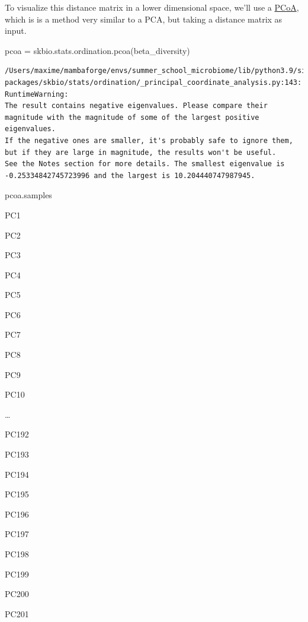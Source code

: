 \documentclass[
  letterpaper,
]{book}
\newenvironment{Shaded}{}{}
\newcommand{\NormalTok}[1]{\textcolor[rgb]{0.14,0.16,0.18}{#1}}
\newcommand{\OperatorTok}[1]{\textcolor[rgb]{0.14,0.16,0.18}{#1}}
\begin{document}
To visualize this distance matrix in a lower dimensional space, we'll
use a
\href{https://en.wikipedia.org/wiki/Multidimensional_scaling\#Types}{PCoA},
which is is a method very similar to a PCA, but taking a distance matrix
as input.

\begin{Shaded}
\begin{Highlighting}[]
\NormalTok{pcoa }\OperatorTok{=}\NormalTok{ skbio.stats.ordination.pcoa(beta\_diversity)}
\end{Highlighting}
\end{Shaded}

\begin{verbatim}
/Users/maxime/mambaforge/envs/summer_school_microbiome/lib/python3.9/site-packages/skbio/stats/ordination/_principal_coordinate_analysis.py:143: RuntimeWarning:
The result contains negative eigenvalues. Please compare their magnitude with the magnitude of some of the largest positive eigenvalues.
If the negative ones are smaller, it's probably safe to ignore them, but if they are large in magnitude, the results won't be useful.
See the Notes section for more details. The smallest eigenvalue is -0.25334842745723996 and the largest is 10.204440747987945.
\end{verbatim}

\begin{Shaded}
\begin{Highlighting}[]
\NormalTok{pcoa.samples}
\end{Highlighting}
\end{Shaded}

PC1

PC2

PC3

PC4

PC5

PC6

PC7

PC8

PC9

PC10

\ldots{}

PC192

PC193

PC194

PC195

PC196

PC197

PC198

PC199

PC200

PC201
\end{document}
